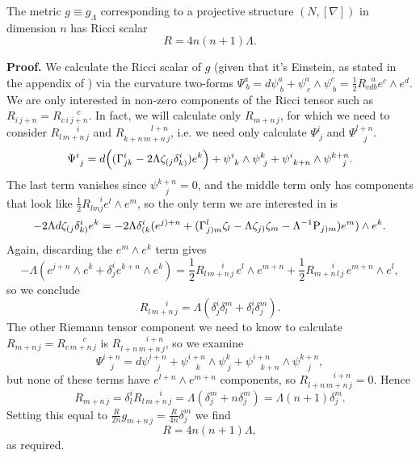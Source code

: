 \begin{lemma} \label{lem:Ricci_scalar} The metric $g\equiv g_\Lambda$ corresponding to a projective structure $(N,[\nabla])$ in dimension $n$ has Ricci scalar
\[
R=4n(n+1)\Lambda.
\]
\end{lemma}
{\bf Proof.} We calculate the Ricci scalar of $g$ (given that it's Einstein, as stated in the appendix of \cite{DM}) via the curvature two-forms $\Psi_{\ b}^{a}={d}\psi_{\ b}^{a}+\psi_{\ c}^{a}\wedge\psi_{\ b}^{c}=\frac{1}{2}R_{cdb}^{\ \ \ a}e^{c}\wedge e^{d}$. We are only interested in non-zero components of the Ricci tensor
such as $R_{i\, j+n}=R_{c\,i\, j+n}^{\qquad c}$. In fact, we will
calculate only $R_{m+n\, j}$, for which we need to consider $R_{l\, m+n\, j}^{\qquad\  i}$
and $R_{k+n\, m+n\, j}^{\qquad\quad\ \  l+n}$, i.e. we need only calculate
$\Psi_{\ j}^{i}$ and $\Psi_{\quad j}^{l+n}$. 
\[
\Psi_{\ j}^{i}= d\Bigl((\Gamma_{jk}^{i}-2\Lambda \zeta_{(j}\delta_{k)}^{i})e^{k}\Bigr)+\psi_{\ k}^{i}\wedge\psi_{\ j}^{k}+\psi_{\ k+n}^{i}\wedge\psi_{\quad   j}^{k+n}.
\]
The last term vanishes since $\psi_{\quad j}^{k+n}=0$, and the middle
term only has components that look like $\frac{1}{2}R_{lmj}^{\quad\ i}e^{l}\wedge e^{m}$,
so the only term we are interested in is 
\[
-2\Lambda d\zeta_{(j}\delta_{k)}^{i}e^{k}=-2\Lambda\delta_{(k}^{i}(e^{j)+n}+(\Gamma_{j)m}^{l}\zeta_{l}-\Lambda \zeta_{j)}\zeta_{m}-\Lambda^{-1}\mathrm{P}_{j)m})e^{m})\wedge e^{k}.
\]
Again, discarding the $e^{m}\wedge e^{k}$ term gives
\[
-\Lambda(e^{j+n}\wedge e^{k}+\delta_{j}^{i}e^{k+n}\wedge e^{k})=\frac{1}{2}R_{l\, m+n\, j}^{\qquad\ i}\,e^{l}\wedge e^{m+n}+\frac{1}{2}R_{m+n\, l\, j}^{\qquad\ i}\,e^{m+n}\wedge e^{l},
\]
so we conclude
\[
R_{l\, m+n\, j}^{\qquad\ i}=\Lambda(\delta_{j}^{i}\delta_{l}^{m}+\delta_{l}^{i}\delta_{j}^{m}).
\]
The other Riemann tensor component we need to know to calculate $R_{m+n\, j}=R_{c\, m+n\, j}^{\qquad\ c}$
is $R_{l+n\, m+n\, j}^{\qquad\quad\ i+n}$, so we examine
\[
\Psi_{\quad j}^{i+n}={d}\psi_{\quad j}^{i+n}+\psi_{\quad k}^{i+n}\wedge\psi_{\ j}^{k}+\psi_{\quad k+n}^{i+n}\wedge\psi_{\quad j}^{k+n},
\]
but none of these terms have $e^{l+n}\wedge e^{m+n}$ components,
so $R_{l+n\, m+n\, j}^{\qquad\quad\ i+n}=0$. Hence 
\[
R_{m+n\, j}=\delta_{l}^{i}R_{l\, m+n\, j}^{\qquad\ i}=\Lambda(\delta_{j}^{m}+n\delta_{j}^{m})=\Lambda(n+1)\delta_{j}^{m}.
\]
Setting this equal to $\frac{R}{2n}g_{m+n\, j}=\frac{R}{4n}\delta_{j}^{m}$
we find 
\[
R=4n(n+1)\Lambda,
\]
as required.
\koniec